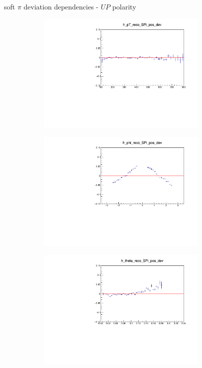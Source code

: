 \documentclass[11pt]{beamer}
\begin{document}
\begin{frame}{soft $\pi$ deviation dependencies - $UP$ polarity}
\begin{figure}
\begin{subfigure}{0.45\textwidth}
\includegraphics[width=0.9\textwidth]{first/up_pdf/deviation/h_pt_reco_SPi_pos_dev.pdf}
\end{subfigure}
\begin{subfigure}{0.45\textwidth}
\includegraphics[width=0.9\textwidth]{first/up_pdf/deviation/h_phi_reco_SPi_pos_dev.pdf}
\end{subfigure}
\begin{subfigure}{0.45\textwidth}
\includegraphics[width=0.9\textwidth]{first/up_pdf/deviation/h_theta_reco_SPi_pos_dev.pdf}

\end{subfigure}
\end{figure}
\end{frame}
\end{document}
